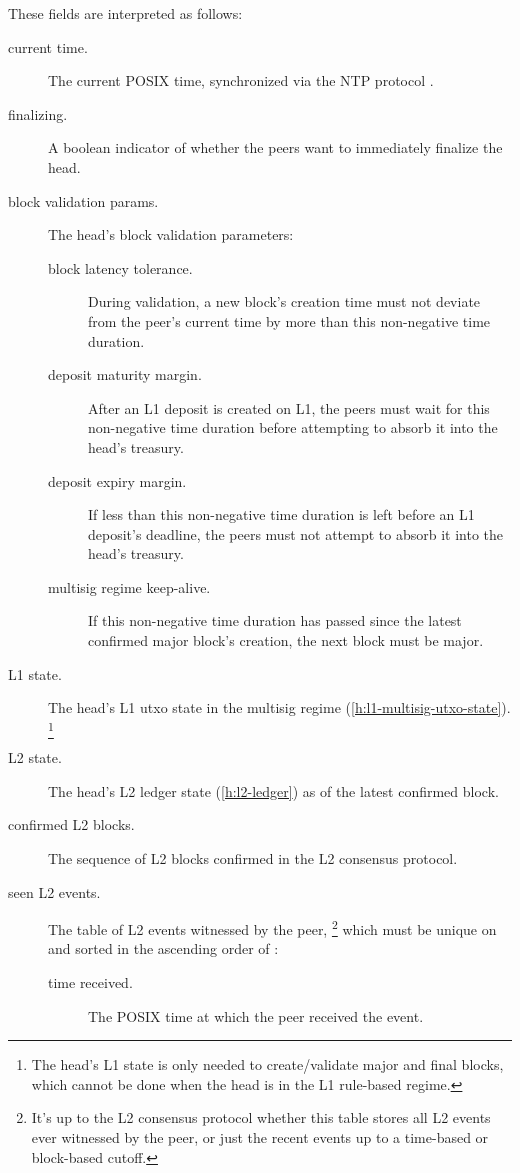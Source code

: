 \documentclass[../hydrozoa.tex]{subfiles}
\begin{document}
These fields are interpreted as follows:
\begin{description}
  \item[current time.] The current POSIX time, synchronized via the NTP protocol \citep{MillsEtAlNetworkTimeProtocol2010}.
  \item[finalizing.] A boolean indicator of whether the peers want to immediately finalize the head.
  \item[block validation params.] The head's block validation parameters:
    \begin{description}
      \item[block latency tolerance.] During validation, a new block's creation time must not deviate from the peer's current time by more than this non-negative time duration.
      \item[deposit maturity margin.] After an L1 deposit is created on L1, the peers must wait for this non-negative time duration before attempting to absorb it into the head's treasury.
      \item[deposit expiry margin.] If less than this non-negative time duration is left before an L1 deposit's deadline, the peers must not attempt to absorb it into the head's treasury.
      \item[multisig regime keep-alive.] If this non-negative time duration has passed since the latest confirmed major block's creation, the next block must be major.
    \end{description}
  \item[L1 state.] The head's L1 utxo state in the multisig regime (\cref{h:l1-multisig-utxo-state}).%
    \footnote{The head's L1 state is only needed to create/validate major and final blocks, which cannot be done when the head is in the L1 rule-based regime.}
  \item[L2 state.] The head's L2 ledger state (\cref{h:l2-ledger}) as of the latest confirmed block.
  \item[confirmed L2 blocks.] The sequence of L2 blocks confirmed in the L2 consensus protocol.
  \item[seen L2 events.] The table of L2 events witnessed by the peer,%
    \footnote{It's up to the L2 consensus protocol whether this table stores all L2 events ever witnessed by the peer, or just the recent events up to a time-based or block-based cutoff.}
    which must be unique on  and sorted in the ascending order of :
    \begin{description}
      \item[time received.] The POSIX time at which the peer received the event.

\end{description}
\end{description}
\end{document}

